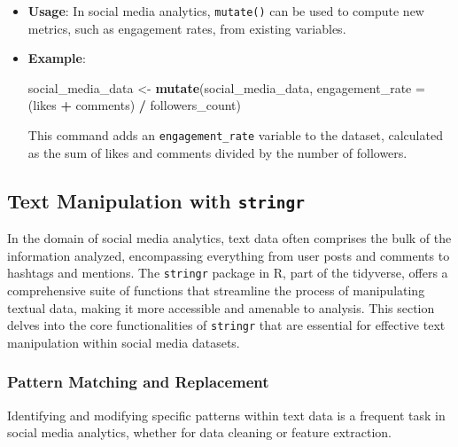 \documentclass[
]{book}
\newenvironment{Shaded}{\begin{snugshade}}{\end{snugshade}}
\newcommand{\AttributeTok}[1]{\textcolor[rgb]{0.13,0.29,0.53}{#1}}
\newcommand{\FunctionTok}[1]{\textcolor[rgb]{0.13,0.29,0.53}{\textbf{#1}}}
\newcommand{\NormalTok}[1]{#1}
\newcommand{\OtherTok}[1]{\textcolor[rgb]{0.56,0.35,0.01}{#1}}
\newcommand{\SpecialCharTok}[1]{\textcolor[rgb]{0.81,0.36,0.00}{\textbf{#1}}}
\begin{document}
\begin{itemize}
\item
  \textbf{Usage}: In social media analytics, \texttt{mutate()} can be used to compute new metrics, such as engagement rates, from existing variables.
\item
  \textbf{Example}:

\begin{Shaded}
\begin{Highlighting}[]
\NormalTok{social\_media\_data }\OtherTok{\textless{}{-}} \FunctionTok{mutate}\NormalTok{(social\_media\_data, }\AttributeTok{engagement\_rate =}\NormalTok{ (likes }\SpecialCharTok{+}\NormalTok{ comments) }\SpecialCharTok{/}\NormalTok{ followers\_count)}
\end{Highlighting}
\end{Shaded}

  This command adds an \texttt{engagement\_rate} variable to the dataset, calculated as the sum of likes and comments divided by the number of followers.
\end{itemize}

\hypertarget{text-manipulation-with-stringr}{%
\subsection{\texorpdfstring{Text Manipulation with \texttt{stringr}}{Text Manipulation with stringr}}\label{text-manipulation-with-stringr}}

In the domain of social media analytics, text data often comprises the bulk of the information analyzed, encompassing everything from user posts and comments to hashtags and mentions. The \texttt{stringr} package in R, part of the tidyverse, offers a comprehensive suite of functions that streamline the process of manipulating textual data, making it more accessible and amenable to analysis. This section delves into the core functionalities of \texttt{stringr} that are essential for effective text manipulation within social media datasets.

\hypertarget{pattern-matching-and-replacement}{%
\subsubsection{Pattern Matching and Replacement}\label{pattern-matching-and-replacement}}

Identifying and modifying specific patterns within text data is a frequent task in social media analytics, whether for data cleaning or feature extraction.
\end{document}
